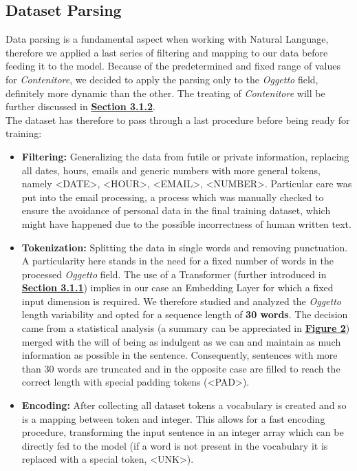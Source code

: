 \documentclass[12pt]{article}
\begin{document}
\subsection{Dataset Parsing}
Data parsing is a fundamental aspect when working with Natural Language, therefore we applied a last series of filtering and mapping to our data before feeding it to the model. Because of the predetermined and fixed range of values for \textit{Contenitore}, we decided to apply the parsing only to the \textit{Oggetto} field, definitely more dynamic than the other. The treating of \textit{Contenitore} will be further discussed in \hyperref[sec:office-module]{\textbf{Section 3.1.2}}.
\\The dataset has therefore to pass through a last procedure before being ready for training:
\begin{itemize}
    \item \textbf{Filtering:} Generalizing the data from futile or private information, replacing all dates, hours, emails and generic numbers with more general tokens, namely \textless DATE\textgreater, \textless HOUR\textgreater, \textless EMAIL\textgreater, \textless NUMBER\textgreater. Particular care was put into the email processing, a process which was manually checked to ensure the avoidance of personal data in the final training dataset, which might have happened due to the possible incorrectness of human written text.
    \item \textbf{Tokenization:} Splitting the data in single words and removing punctuation. A particularity here stands in the need for a fixed number of words in the processed \textit{Oggetto} field. The use of a Transformer (further introduced in \hyperref[sec:object-module]{\textbf{Section 3.1.1}}) implies in our case an Embedding Layer for which a fixed input dimension is required. We therefore studied and analyzed the \textit{Oggetto} length variability and opted for a sequence length of \textbf{30 words}. The decision came from a statistical analysis (a summary can be appreciated in \hyperref[fig:objectlength]{\textbf{Figure 2}}) merged with the will of being as indulgent as we can and maintain as much information as possible in the sentence. Consequently, sentences with more than 30 words are truncated and in the opposite case are filled to reach the correct length with special padding tokens (\textless PAD\textgreater).
    \item \textbf{Encoding:} After collecting all dataset tokens a vocabulary is created and so is a mapping between token and integer. This allows for a fast encoding procedure, transforming the input sentence in an integer array which can be directly fed to the model (if a word is not present in the vocabulary it is replaced with a special token, \textless UNK\textgreater).
\end{itemize}
\end{document}
